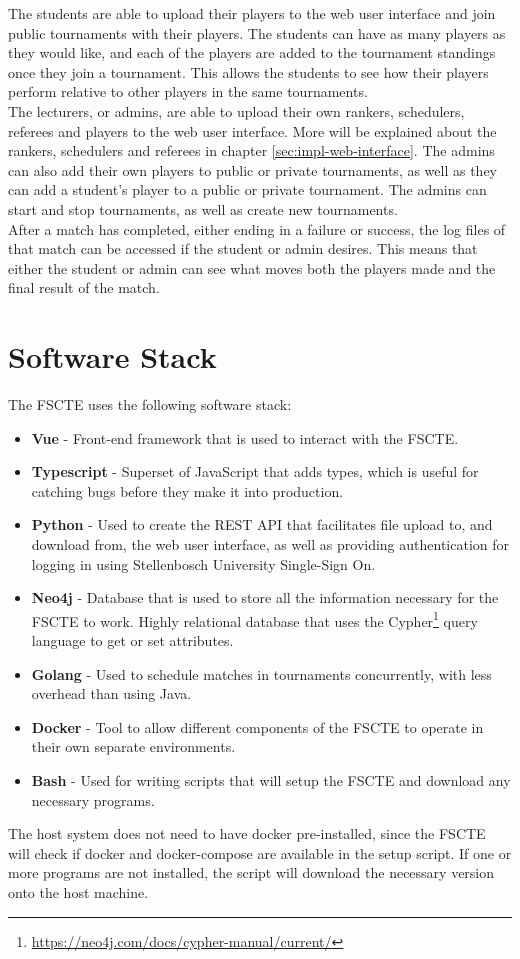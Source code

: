 \documentclass[a4paper, 12pt]{report}
\begin{document}
The students are able to upload their players to the web user interface and join
public tournaments with their players. The students can have as many players as
they would like, and each of the players are added to the tournament standings
once they join a tournament. This allows the students to see how their players
perform relative to other players in the same tournaments. \\

The lecturers, or admins, are able to upload their own rankers, schedulers,
referees and players to the web user interface. More will be explained about the
rankers, schedulers and referees in chapter \ref{sec:impl-web-interface}. The
admins can also add their own players to public or private tournaments, as well
as they can add a student's player to a public or private tournament. The admins
can start and stop tournaments, as well as create new tournaments. \\

After a match has completed, either ending in a failure or success, the log files
of that match can be accessed if the student or admin desires. This means that
either the student or admin can see what moves both the players made and the
final result of the match.

\section{Software Stack}

The FSCTE uses the following software stack:
\begin{itemize}
	\item \textbf{Vue} - Front-end framework that is used to interact with the
	FSCTE.
	\item \textbf{Typescript} - Superset of JavaScript that adds types, which
	is useful for catching bugs before they make it into production.
	\item \textbf{Python} - Used to create the REST API that facilitates
	file upload to, and download from, the web user interface, as well as providing
	authentication for logging in using Stellenbosch University Single-Sign On.
	\item \textbf{Neo4j} - Database that is used to store all the information
	necessary for the FSCTE to work. Highly relational database that uses the
	Cypher\footnote{\url{https://neo4j.com/docs/cypher-manual/current/}} query
	language to get or set attributes.
	\item \textbf{Golang} - Used to schedule matches in tournaments concurrently,
	with less overhead than using Java.
	\item \textbf{Docker} - Tool to allow different components of the FSCTE to
	operate in their own separate environments.
	\item \textbf{Bash} - Used for writing scripts that will setup the FSCTE and
	download any necessary programs.
\end{itemize}
The host system does not need to have docker pre-installed, since the FSCTE will
check if docker and docker-compose are available in the setup script. If one or
more programs are not installed, the script will download the necessary version
onto the host machine.
\end{document}
